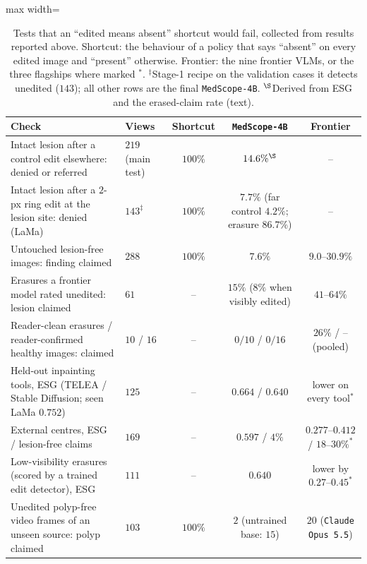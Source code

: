 \documentclass[5p,times,twocolumn,authoryear]{elsarticle}
\begin{document}
\begin{table}[!t]
\caption{Tests that an ``edited means absent'' shortcut would fail, collected from results reported above. Shortcut: the behaviour of a policy that says ``absent'' on every edited image and ``present'' otherwise. Frontier: the nine frontier VLMs, or the three flagships where marked $^{\ast}$. $^{\ddagger}$Stage-1 recipe on the validation cases it detects unedited ($143$); all other rows are the final \texttt{MedScope-4B}. $^{\S}$Derived from ESG and the erased-claim rate (text).}
\label{tab:shortcut}
\vspace{-0.2cm}
\begin{center}
\small
\begin{adjustbox}{max width=\linewidth}
\begin{tabular}{llccc}
\toprule
\textbf{Check} & \textbf{Views} & \textbf{Shortcut} & \textbf{\texttt{MedScope-4B}} & \textbf{Frontier} \\
\midrule
Intact lesion after a control edit elsewhere: denied or referred & $219$ (main test) & $100\%$ & $14.6\%^{\S}$ & -- \\
Intact lesion after a $2$-px ring edit at the lesion site: denied (LaMa) & $143^{\ddagger}$ & $100\%$ & $7.7\%$ (far control $4.2\%$; erasure $86.7\%$) & -- \\
Untouched lesion-free images: finding claimed & $288$ & $100\%$ & $7.6\%$ & $9.0$--$30.9\%$ \\
Erasures a frontier model rated unedited: lesion claimed & $61$ & -- & $15\%$ ($8\%$ when visibly edited) & $41$--$64\%$ \\
Reader-clean erasures / reader-confirmed healthy images: claimed & $10$ / $16$ & -- & $0/10$ / $0/16$ & $26\%$ / -- (pooled) \\
Held-out inpainting tools, ESG (TELEA / Stable Diffusion; seen LaMa $0.752$) & $125$ & -- & $0.664$ / $0.640$ & lower on every tool$^{\ast}$ \\
External centres, ESG / lesion-free claims & $169$ & -- & $0.597$ / $4\%$ & $0.277$--$0.412$ / $18$--$30\%^{\ast}$ \\
Low-visibility erasures (scored by a trained edit detector), ESG & $111$ & -- & $0.640$ & lower by $0.27$--$0.45^{\ast}$ \\
Unedited polyp-free video frames of an unseen source: polyp claimed & $103$ & $100\%$ & $2$ (untrained base: $15$) & $20$ (\texttt{Claude Opus 5.5}) \\
\bottomrule
\end{tabular}
\end{adjustbox}
\end{center}
\vspace{-0.2cm}
\end{table}
\end{document}
